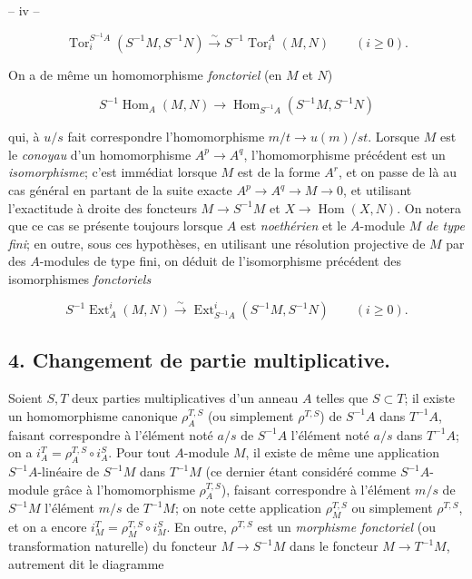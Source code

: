 \newpage


\begin{center}
-- iv --
\end{center}

$$\operatorname{Tor}_i^{S^{-1}A}(S^{-1}M, S^{-1}N) \xrightarrow{\sim} S^{-1}\operatorname{Tor}_i^A(M,N) \qquad (i \geq 0).$$

On a de même un homomorphisme \emph{fonctoriel} (en $M$ et $N$)

$$S^{-1}\operatorname{Hom}_A(M,N) \to \operatorname{Hom}_{S^{-1}A}(S^{-1}M, S^{-1}N)$$

qui, à $u/s$ fait correspondre l'homomorphisme $m/t \to u(m)/st$. Lorsque $M$ est le \emph{conoyau} d'un homomorphisme $A^p \to A^q$, l'homomorphisme précédent est un \emph{isomorphisme}; c'est immédiat lorsque $M$ est de la forme $A^r$, et on passe de là au cas général en partant de la suite exacte $A^p \to A^q \to M \to 0$, et utilisant l'exactitude à droite des foncteurs $M \to S^{-1}M$ et $X \to \operatorname{Hom}(X,N)$. On notera que ce cas se présente toujours lorsque $A$ est \emph{noethérien} et le $A$-module $M$ \emph{de type fini}; en outre, sous ces hypothèses, en utilisant une résolution projective de $M$ par des $A$-modules de type fini, on déduit de l'isomorphisme précédent des isomorphismes \emph{fonctoriels}

$$S^{-1}\operatorname{Ext}_A^i(M,N) \xrightarrow{\sim} \operatorname{Ext}_{S^{-1}A}^i(S^{-1}M, S^{-1}N) \qquad (i \geq 0).$$

\subsection*{4. Changement de partie multiplicative.}

Soient $S, T$ deux parties multiplicatives d'un anneau $A$ telles que $S \subset T$; il existe un homomorphisme canonique $\rho_A^{T,S}$ (ou simplement $\rho^{T,S}$) de $S^{-1}A$ dans $T^{-1}A$, faisant correspondre à l'élément noté $a/s$ de $S^{-1}A$ l'élément noté $a/s$ dans $T^{-1}A$; on a $i_A^T = \rho_A^{T,S} \circ i_A^S$. Pour tout $A$-module $M$, il existe de même une application $S^{-1}A$-linéaire de $S^{-1}M$ dans $T^{-1}M$ (ce dernier étant considéré comme $S^{-1}A$-module grâce à l'homomorphisme $\rho_A^{T,S}$), faisant correspondre à l'élément $m/s$ de $S^{-1}M$ l'élément $m/s$ de $T^{-1}M$; on note cette application $\rho_M^{T,S}$ ou simplement $\rho^{T,S}$, et on a encore $i_M^T = \rho_M^{T,S} \circ i_M^S$. En outre, $\rho^{T,S}$ est un \emph{morphisme fonctoriel} (ou transformation naturelle) du foncteur $M \to S^{-1}M$ dans le foncteur $M \to T^{-1}M$, autrement dit le diagramme

